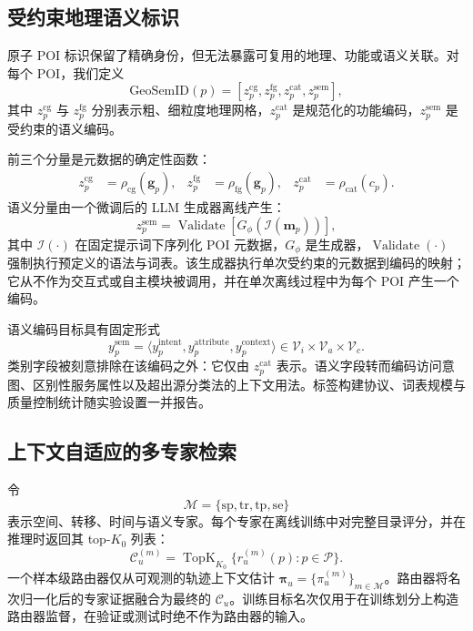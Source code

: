 \documentclass[10pt,fontset=none,twocolumn]{ctexart}
\newcommand{\gsid}{\mathrm{GeoSemID}}
\newcommand{\Experts}{\mathcal{M}}
\newcommand{\POIs}{\mathcal{P}}
\begin{document}
\subsection{受约束地理语义标识}

原子 POI 标识保留了精确身份，但无法暴露可复用的地理、功能或语义关联。对每个 POI，我们定义
\begin{equation}
\gsid(p)
=
[
z_{p}^{\mathrm{cg}},
z_{p}^{\mathrm{fg}},
z_{p}^{\mathrm{cat}},
z_{p}^{\mathrm{sem}}
],
\label{eq:geosemid_definition}
\end{equation}
其中 $z_{p}^{\mathrm{cg}}$ 与 $z_{p}^{\mathrm{fg}}$ 分别表示粗、细粒度地理网格，$z_{p}^{\mathrm{cat}}$ 是规范化的功能编码，$z_{p}^{\mathrm{sem}}$ 是受约束的语义编码。

前三个分量是元数据的确定性函数：
\begin{align}
z_{p}^{\mathrm{cg}}&=\rho_{\mathrm{cg}}(\bm{g}_p),&
z_{p}^{\mathrm{fg}}&=\rho_{\mathrm{fg}}(\bm{g}_p),&
z_{p}^{\mathrm{cat}}&=\rho_{\mathrm{cat}}(c_p).
\label{eq:deterministic_codes}
\end{align}
语义分量由一个微调后的 LLM 生成器离线产生：
\begin{equation}
z_{p}^{\mathrm{sem}}
=
\operatorname{Validate}
\left[
G_{\phi}\!\left(\mathcal{I}(\bm{m}_p)\right)
\right],
\label{eq:semantic_generation}
\end{equation}
其中 $\mathcal{I}(\cdot)$ 在固定提示词下序列化 POI 元数据，$G_{\phi}$ 是生成器，$\operatorname{Validate}(\cdot)$ 强制执行预定义的语法与词表。该生成器执行单次受约束的元数据到编码的映射；它从不作为交互式或自主模块被调用，并在单次离线过程中为每个 POI 产生一个编码。

语义编码目标具有固定形式
\begin{equation}
y_p^{\mathrm{sem}}
=
\langle
y_p^{\mathrm{intent}},
y_p^{\mathrm{attribute}},
y_p^{\mathrm{context}}
\rangle
\in
\mathcal{V}_{i}\times\mathcal{V}_{a}\times\mathcal{V}_{c}.
\label{eq:semantic_schema}
\end{equation}
类别字段被刻意排除在该编码之外：它仅由 $z_p^{\mathrm{cat}}$ 表示。语义字段转而编码访问意图、区别性服务属性以及超出源分类法的上下文用法。标签构建协议、词表规模与质量控制统计随实验设置一并报告。

\subsection{上下文自适应的多专家检索}

令
\begin{equation}
\Experts=\{\mathrm{sp},\mathrm{tr},\mathrm{tp},\mathrm{se}\}
\label{eq:expert_set}
\end{equation}
表示空间、转移、时间与语义专家。每个专家在离线训练中对完整目录评分，并在推理时返回其 top-$K_0$ 列表：
\begin{equation}
\mathcal{C}_{u}^{(m)}
=
\operatorname{TopK}_{K_0}
\{r_{u}^{(m)}(p):p\in\POIs\}.
\label{eq:expert_candidate}
\end{equation}
一个样本级路由器仅从可观测的轨迹上下文估计 $\bm{\pi}_u=\{\pi_u^{(m)}\}_{m\in\Experts}$。路由器将名次归一化后的专家证据融合为最终的 $\mathcal{C}_u$。训练目标名次仅用于在训练划分上构造路由器监督，在验证或测试时绝不作为路由器的输入。
\end{document}
